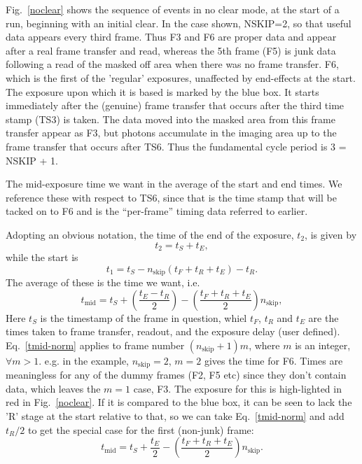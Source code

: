 \documentclass[12pt,a4paper]{article}
\begin{document}
Fig.~\ref{noclear} shows the sequence of events in no clear mode, at the start of
a run, beginning with an initial clear. In the case shown, NSKIP=2, so that
useful data appears every third frame. Thus F3 and F6 are proper data and
appear after a real frame transfer and read, whereas the 5th frame (F5) is
junk data following a read of the masked off area when there was no frame
transfer. F6, which is the first of the 'regular' exposures, unaffected by
end-effects at the start. The exposure upon which it is based is marked by the
blue box. It starts immediately after the (genuine) frame transfer that occurs
after the third time stamp (TS3) is taken. The data moved into the masked area
from this frame transfer appear as F3, but photons accumulate in the imaging
area up to the frame transfer that occurs after TS6. Thus the fundamental
cycle period is 3 = NSKIP + 1.

The mid-exposure time we want in the average of the start and end times. We
reference these with respect to TS6, since that is the time stamp that will be
tacked on to F6 and is the ``per-frame'' timing data referred to earlier.

Adopting an obvious notation, the time of the end of the exposure, $t_2$, is
given by
\[ t_2 = t_S + t_E,\]
while the start is
\[ t_1 = t_S - n_{\mathrm{skip}} (t_F + t_R + t_E) - t_R.\]
The average of these is the time we want, i.e.
\begin{equation}
t_{\mathrm{mid}} = t_S + \left(\frac{t_E - t_R}{2}\right) -
\left(\frac{t_F + t_R + t_E}{2}\right) n_{\mathrm{skip}} ,\label{tmid-norm}
\end{equation}
Here $t_S$ is the timestamp of the frame in question, whiel $t_F$, $t_R$ and 
$t_E$ are the times taken to frame transfer, readout, and the exposure
delay (user defined). Eq.~\ref{tmid-norm} applies
to frame number $(n_{\mathrm{skip}}+1) m$, where $m$ is an integer, $\forall m >
  1$. e.g. in the example, $n_{\mathrm{skip}} = 2$, $m = 2$ gives the time for
  F6. Times are meaningless for any of the dummy frames (F2, F5 etc) since they
  don't contain data, which leaves the $m = 1$ case, F3. The exposure for this
  is high-lighted in red in Fig.~\ref{noclear}. If it is compared to the blue
  box, it can be seen to lack the 'R' stage at the start relative to that,
so we can take Eq.~\ref{tmid-norm} and add $t_R/2$ to get the special
case for the first (non-junk) frame:
\begin{equation}
t_{\mathrm{mid}} = t_S + \frac{t_E}{2} -
\left(\frac{t_F + t_R + t_E}{2}\right) n_{\mathrm{skip}} .\label{tmid-spec}
\end{equation}
\end{document}

